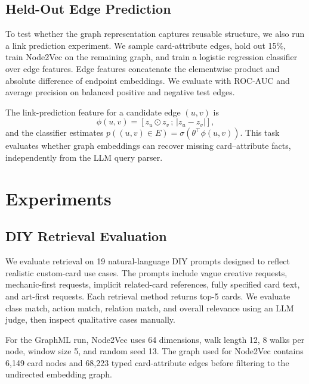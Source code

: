 \documentclass{article}
\begin{document}
\subsection{Held-Out Edge Prediction}

To test whether the graph representation captures reusable structure, we also run a link prediction experiment. We sample card-attribute edges, hold out 15\%, train Node2Vec on the remaining graph, and train a logistic regression classifier over edge features. Edge features concatenate the elementwise product and absolute difference of endpoint embeddings. We evaluate with ROC-AUC and average precision on balanced positive and negative test edges.

The link-prediction feature for a candidate edge $(u,v)$ is
\begin{equation}
\phi(u,v)=[z_u \odot z_v \, ; \, |z_u-z_v|],
\end{equation}
and the classifier estimates $p((u,v)\in E)=\sigma(\theta^\top\phi(u,v))$. This task evaluates whether graph embeddings can recover missing card--attribute facts, independently from the LLM query parser.

\section{Experiments}

\subsection{DIY Retrieval Evaluation}

We evaluate retrieval on 19 natural-language DIY prompts designed to reflect realistic custom-card use cases. The prompts include vague creative requests, mechanic-first requests, implicit related-card references, fully specified card text, and art-first requests. Each retrieval method returns top-5 cards. We evaluate class match, action match, relation match, and overall relevance using an LLM judge, then inspect qualitative cases manually.

For the GraphML run, Node2Vec uses 64 dimensions, walk length 12, 8 walks per node, window size 5, and random seed 13. The graph used for Node2Vec contains 6,149 card nodes and 68,223 typed card-attribute edges before filtering to the undirected embedding graph.
\end{document}
